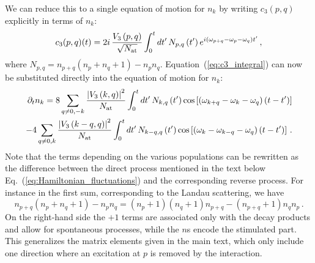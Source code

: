 \documentclass[aps,prd,notitlepage,amsfonts,amssymb,amsmath,nofootinbib,superscriptaddress,longbibliography]{revtex4-2}
\begin{document}
\begin{appendices}
\begin{align}
\begin{split}
\end{split}
\end{align}
We can reduce this to a single equation of motion for $n_{k}$ by writing $c_{3}(p,q)$ explicitly in terms of $n_{k}$:
\begin{equation}
    c_{3}(p,q)(t) = 2 i \, \frac{V_{3}\left(p,q\right)}{\sqrt{N_{\rm at}}}  \int_{0}^{t} dt^{\prime} \, N_{p,q}\left(t^{\prime}\right) e^{i\left(\omega_{p+q}-\omega_{p}-\omega_{q}\right)t^{\prime}} \, ,
    \label{eq:c3_integral}
\end{equation}
where $N_{p,q} = n_{p+q} \left(n_{p}+n_{q}+1\right) - n_{p}n_{q}$. Equation~(\ref{eq:c3_integral}) can now be substituted directly into the equation of motion for $n_{k}$:
\begin{align}
\begin{split}
\partial_{t} n_{k} = 8 \sum_{q \neq 0 , - k} \frac{\left|V_{3}\left(k,q\right)\right|^{2} }{N_{\rm at}} \int_{0}^{t} dt^{\prime} \, N_{k,q}\left(t^{\prime}\right) {\rm cos}\left[\left(\omega_{k+q}-\omega_{k}-\omega_{q}\right)\left(t-t^{\prime}\right)\right] \\
    - 4 \sum_{q \neq 0 , k}  \frac{\left|V_{3}\left(k-q,q\right)\right|^{2} }{N_{\rm at}} \int_{0}^{t} dt^{\prime} \, N_{k-q,q}\left(t^{\prime}\right) {\rm cos}\left[\left(\omega_{k}-\omega_{k-q}-\omega_{q}\right)\left(t-t^{\prime}\right)\right] \,.
\label{eq:nk_eom_full_non_markovian}
\end{split}
\end{align}
Note that the terms depending on the various populations can be rewritten as the difference between the direct process mentioned in the text below Eq.~(\ref{eq:Hamiltonian_fluctuations}) and the corresponding reverse process. For instance in the first sum, corresponding to the Landau scattering, we have
\begin{equation}
   n_{p+q}\left(n_{p}+n_{q}+1\right) - n_{p} n_{q}  = \left(n_{p}+1\right) \left(n_{q}+1\right) n_{p+q} - \left(n_{p+q}+1\right) n_{q} n_{p} \, .
\end{equation}
On the right-hand side the $+1$ terms are associated only with the decay products and allow for spontaneous processes, while the $n$s encode the stimulated part. This generalizes the matrix elements given in the main text, which only include one direction where an excitation at $p$ is removed by the interaction.


\end{appendices}
\end{document}
